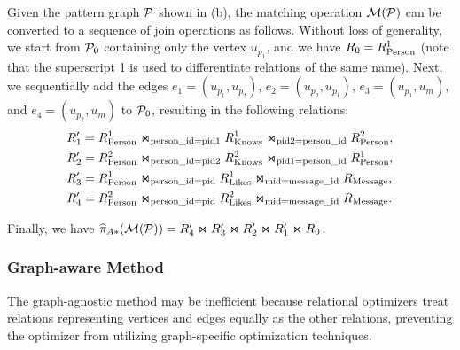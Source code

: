 \begin{example}
  Given the pattern graph $\mathcal{P}$ shown in (b), the matching operation $\mathcal{M}(\mathcal{P})$ can be converted to a sequence of join operations as follows. Without loss of generality, we start from $\mathcal{P}_0$ containing only the vertex $u_{p_1}$, and we have ${R_{0}} = {R^{1}_{\text{Person}}}$ (note that the superscript 1 is used to differentiate relations of the same name).
  Next, we sequentially add the edges $e_1 = (u_{p_1}, u_{p_2})$, $e_2 = (u_{p_2}, u_{p_1})$, $e_3 = (u_{p_1}, u_m)$, and $e_4 = (u_{p_2}, u_m)$ to $\mathcal{P}_0$, resulting in the following relations:
  \begin{equation*}
    \begin{split}
    R'_1 &= {R^{1}_{\text{Person}}} \Join_{\text{person\_id}=\text{pid1}} {R^{1}_{\text{Knows}}} \Join_{\text{pid2}=\text{person\_id}} {R^{2}_{\text{Person}}}, \\
    R'_2 &= {R^{2}_{\text{Person}}} \Join_{\text{person\_id}=\text{pid2}} {R^{2}_{\text{Knows}}} \Join_{\text{pid1}=\text{person\_id}} {R^{1}_{\text{Person}}}, \\
    R'_3 &= {R^{1}_{\text{Person}}} \Join_{\text{person\_id}=\text{pid}} {R^{1}_{\text{Likes}}} \Join_{\text{mid}=\text{message\_id}} {R_{\text{Message}}}, \\
    R'_4 &= {R^{2}_{\text{Person}}} \Join_{\text{person\_id}=\text{pid}} {R^{2}_{\text{Likes}}} \Join_{\text{mid}=\text{message\_id}} {R_{\text{Message}}}.
    \end{split}
    \end{equation*}

    Finally, we have $\widehat{\pi}_{A*}(\mathcal{M}(\mathcal{P})) = R'_4 \Join R'_3 \Join R'_2 \Join R'_1 \Join {\ensuremath R_{0}}$.

\end{example}

\subsubsection{Graph-aware Method}
\label{sec:graph-aware}
The graph-agnostic method may be inefficient because relational optimizers treat relations representing vertices and edges equally as the other relations, preventing the optimizer from utilizing graph-specific optimization techniques. %

